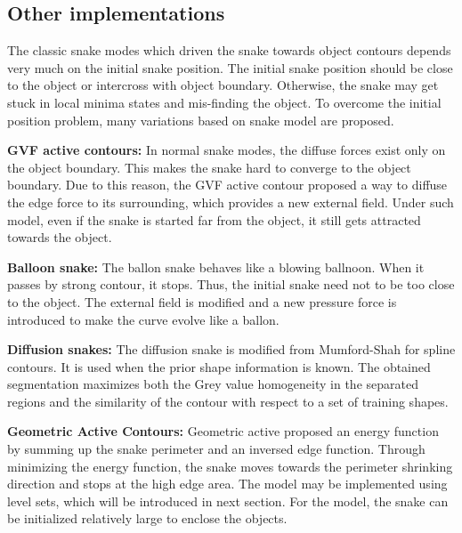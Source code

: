 \subsection{Other implementations}
The classic snake modes which driven the snake towards object contours depends very much on the initial snake position.
The initial snake position should be close to the object or intercross with object boundary. Otherwise, the snake may
get stuck in local minima states and mis-finding the object. To overcome the initial position problem, many variations
based on snake model are proposed.

\textbf{GVF active contours: } In normal snake modes, the diffuse forces exist only on the object boundary. This 
makes the snake hard to converge to the object boundary. Due to this reason, the GVF active contour proposed a way to diffuse
the edge force to its surrounding, which provides a new external field. Under such model, even if the snake is started far from the object, it still gets attracted 
towards the object\cite{xu1998snakes}.

\textbf{Balloon snake: } The ballon snake \cite{kass1988snakes} behaves like a blowing ballnoon. When it passes by strong contour, it stops. Thus, the
initial snake need not to be too close to the object. The external field is modified and a new pressure force is introduced to make the curve evolve like a ballon.

\textbf{Diffusion snakes: } The diffusion snake \cite{cremers2002diffusion} is modified from Mumford-Shah \cite{mumford2006optimal} for spline contours. It is used 
when the prior shape information is known. The obtained segmentation maximizes both the Grey value homogeneity in the separated regions and the similarity of the contour with respect to a set of training shapes.

\textbf{Geometric Active Contours: } Geometric active \cite{malladi1995shape} proposed an energy function by summing up the snake perimeter and an inversed edge function. Through minimizing the energy function, the snake moves towards the perimeter shrinking direction and stops at the high edge area. The model may be implemented using level sets, which will be introduced in next section. For the model, the snake can be initialized relatively large to enclose the objects.
